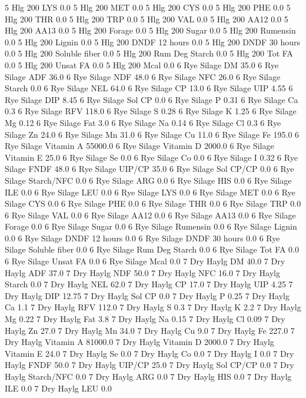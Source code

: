 \documentclass[letterpaper,10pt,english]{sphinxmanual}
\begin{document}
\begin{sphinxVerbatim}[commandchars=\\\{\},numbers=left,firstnumber=1,stepnumber=1]
5 Hlg 200 LYS 0.0
5 Hlg 200 MET 0.0
5 Hlg 200 CYS 0.0
5 Hlg 200 PHE 0.0
5 Hlg 200 THR 0.0
5 Hlg 200 TRP 0.0
5 Hlg 200 VAL 0.0
5 Hlg 200 AA\PYGZsh{}12 0.0
5 Hlg 200 AA\PYGZsh{}13 0.0
5 Hlg 200 \PYGZpc{} Forage 0.0
5 Hlg 200 Sugar \PYGZpc{} 0.0
5 Hlg 200 Rumensin 0.0
5 Hlg 200 Lignin 0.0
5 Hlg 200 DNDF 12 hours 0.0
5 Hlg 200 DNDF 30 hours 0.0
5 Hlg 200 Soluble fiber 0.0
5 Hlg 200 Rum Deg Starch 0.0
5 Hlg 200 Tot FA 0.0
5 Hlg 200 Unsat FA 0.0
5 Hlg 200 Mcal 0.0
6 Rye Silage DM 35.0
6 Rye Silage ADF 36.0
6 Rye Silage NDF 48.0
6 Rye Silage NFC 26.0
6 Rye Silage Starch 0.0
6 Rye Silage NEL 64.0
6 Rye Silage CP 13.0
6 Rye Silage UIP 4.55
6 Rye Silage DIP 8.45
6 Rye Silage Sol CP 0.0
6 Rye Silage P 0.31
6 Rye Silage Ca 0.3
6 Rye Silage RFV 118.0
6 Rye Silage S 0.28
6 Rye Silage K 1.25
6 Rye Silage Mg 0.12
6 Rye Silage Fat 3.0
6 Rye Silage Na 0.14
6 Rye Silage Cl 0.3
6 Rye Silage Zn 24.0
6 Rye Silage Mn 31.0
6 Rye Silage Cu 11.0
6 Rye Silage Fe 195.0
6 Rye Silage Vitamin A 55000.0
6 Rye Silage Vitamin D 2000.0
6 Rye Silage Vitamin E 25.0
6 Rye Silage Se 0.0
6 Rye Silage Co 0.0
6 Rye Silage I 0.32
6 Rye Silage FNDF 48.0
6 Rye Silage UIP/CP 35.0
6 Rye Silage Sol CP/CP 0.0
6 Rye Silage Starch/NFC 0.0
6 Rye Silage ARG 0.0
6 Rye Silage HIS 0.0
6 Rye Silage ILE 0.0
6 Rye Silage LEU 0.0
6 Rye Silage LYS 0.0
6 Rye Silage MET 0.0
6 Rye Silage CYS 0.0
6 Rye Silage PHE 0.0
6 Rye Silage THR 0.0
6 Rye Silage TRP 0.0
6 Rye Silage VAL 0.0
6 Rye Silage AA\PYGZsh{}12 0.0
6 Rye Silage AA\PYGZsh{}13 0.0
6 Rye Silage \PYGZpc{} Forage 0.0
6 Rye Silage Sugar \PYGZpc{} 0.0
6 Rye Silage Rumensin 0.0
6 Rye Silage Lignin 0.0
6 Rye Silage DNDF 12 hours 0.0
6 Rye Silage DNDF 30 hours 0.0
6 Rye Silage Soluble fiber 0.0
6 Rye Silage Rum Deg Starch 0.0
6 Rye Silage Tot FA 0.0
6 Rye Silage Unsat FA 0.0
6 Rye Silage Mcal 0.0
7 Dry Haylg DM 40.0
7 Dry Haylg ADF 37.0
7 Dry Haylg NDF 50.0
7 Dry Haylg NFC 16.0
7 Dry Haylg Starch 0.0
7 Dry Haylg NEL 62.0
7 Dry Haylg CP 17.0
7 Dry Haylg UIP 4.25
7 Dry Haylg DIP 12.75
7 Dry Haylg Sol CP 0.0
7 Dry Haylg P 0.25
7 Dry Haylg Ca 1.1
7 Dry Haylg RFV 112.0
7 Dry Haylg S 0.3
7 Dry Haylg K 2.2
7 Dry Haylg Mg 0.22
7 Dry Haylg Fat 3.8
7 Dry Haylg Na 0.15
7 Dry Haylg Cl 0.09
7 Dry Haylg Zn 27.0
7 Dry Haylg Mn 34.0
7 Dry Haylg Cu 9.0
7 Dry Haylg Fe 227.0
7 Dry Haylg Vitamin A 81000.0
7 Dry Haylg Vitamin D 2000.0
7 Dry Haylg Vitamin E 24.0
7 Dry Haylg Se 0.0
7 Dry Haylg Co 0.0
7 Dry Haylg I 0.0
7 Dry Haylg FNDF 50.0
7 Dry Haylg UIP/CP 25.0
7 Dry Haylg Sol CP/CP 0.0
7 Dry Haylg Starch/NFC 0.0
7 Dry Haylg ARG 0.0
7 Dry Haylg HIS 0.0
7 Dry Haylg ILE 0.0
7 Dry Haylg LEU 0.0

\end{sphinxVerbatim}
\end{document}

